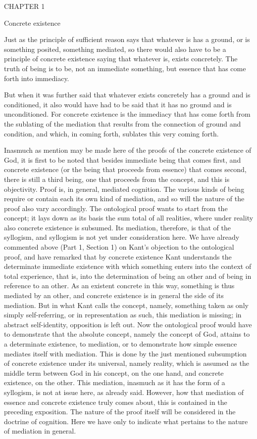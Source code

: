 CHAPTER 1

Concrete existence

Just as the principle of sufficient reason says
that whatever is has a ground,
or is something posited,
something mediated,
so there would also have to be
a principle of concrete existence saying
that whatever is, exists concretely.
The truth of being is to be,
not an immediate something,
but essence that has
come forth into immediacy.

But when it was further said
that whatever exists concretely
has a ground and is conditioned,
it also would have had to be said
that it has no ground and is unconditioned.
For concrete existence is the immediacy
that has come forth from the sublating
of the mediation that results
from the connection of ground and condition,
and which, in coming forth,
sublates this very coming forth.

Inasmuch as mention may be made here of
the proofs of the concrete existence of God,
it is first to be noted that besides
immediate being that comes first,
and concrete existence
(or the being that proceeds from essence)
that comes second, there is still a third being,
one that proceeds from the concept,
and this is objectivity.
Proof is, in general, mediated cognition.
The various kinds of being require or contain
each its own kind of mediation,
and so will the nature of the proof also vary accordingly.
The ontological proof wants to start from the concept;
it lays down as its basis the sum total of all realities,
where under reality also concrete existence is subsumed.
Its mediation, therefore, is that of the syllogism,
and syllogism is not yet under consideration here.
We have already commented above (Part 1, Section 1)
on Kant's objection to the ontological proof,
and have remarked that by concrete existence
Kant understands the determinate immediate existence
with which something enters into the context of total experience,
that is, into the determination of being an other
and of being in reference to an other.
As an existent concrete in this way,
something is thus mediated by an other,
and concrete existence is in general the side of its mediation.
But in what Kant calls the concept, namely,
something taken as only simply self-referring,
or in representation as such, this mediation is missing;
in abstract self-identity, opposition is left out.
Now the ontological proof would have
to demonstrate that the absolute concept,
namely the concept of God,
attains to a determinate existence, to mediation,
or to demonstrate how simple essence
mediates itself with mediation.
This is done by the just mentioned
subsumption of concrete existence
under its universal, namely reality,
which is assumed as the middle term
between God in his concept, on the one hand,
and concrete existence, on the other.
This mediation, inasmuch as it has the form of a syllogism,
is not at issue here, as already said.
However, how that mediation of
essence and concrete existence truly comes about,
this is contained in the preceding exposition.
The nature of the proof itself will be considered
in the doctrine of cognition.
Here we have only to indicate what pertains
to the nature of mediation in general.

